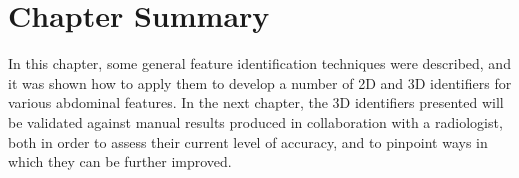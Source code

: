 \afterpage{\clearpage}
\newpage

\section{Chapter Summary}

In this chapter, some general feature identification techniques were described, and it was shown how to apply them to develop a number of 2D and 3D identifiers for various abdominal features. In the next chapter, the 3D identifiers presented will be validated against manual results produced in collaboration with a radiologist, both in order to assess their current level of accuracy, and to pinpoint ways in which they can be further improved.
